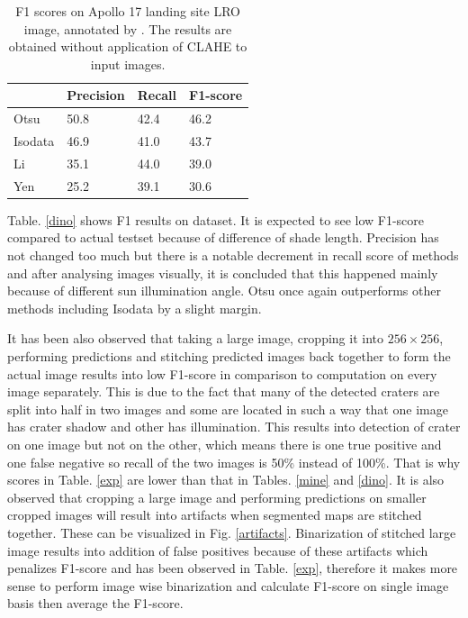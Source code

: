 \documentclass[11pt]{article}
\begin{document}
\begin{table}[H]
	\centering
	\caption{F1 scores on Apollo 17 landing site LRO image, annotated by \cite{dino2020}. The results are obtained without application of CLAHE to input images.}
	\begin{tabular}{l|l|l|l|}
		\cline{2-4}
		\multicolumn{1}{c|}{}         & Precision & Recall & F1-score \\ \hline
		\multicolumn{1}{|l|}{Otsu}    & 50.8      & 42.4   & 46.2     \\ \hline
		\multicolumn{1}{|l|}{Isodata} & 46.9      & 41.0   & 43.7     \\ \hline
		\multicolumn{1}{|l|}{Li}      & 35.1      & 44.0   & 39.0     \\ \hline
		\multicolumn{1}{|l|}{Yen}     & 25.2      & 39.1   & 30.6     \\ \hline
	\end{tabular}
\end{table}

Table. \ref{dino} shows F1 results on \cite{dino2020} dataset. It is expected to see low F1-score compared to actual testset because of difference of shade length. Precision has not changed too much but there is a notable decrement in recall score of methods and after analysing images visually, it is concluded that this happened mainly because of different sun illumination angle. Otsu once again outperforms other methods including Isodata by a slight margin.

It has been also observed that taking a large image, cropping it into $256 \times 256$, performing predictions and stitching predicted images back together to form the actual image results into low F1-score in comparison to computation on every image separately. This is due to the fact that many of the detected craters are split into half in two images and some are located in such a way that one image has crater shadow and other has illumination. This results into detection of crater on one image but not on the other, which means there is one true positive and one false negative so recall of the two images is 50\% instead of 100\%. That is why scores in Table. \ref{exp} are lower than that in Tables. \ref{mine} and \ref{dino}. It is also observed that cropping a large image and performing predictions on smaller cropped images will result into artifacts when segmented maps are stitched together. These can be visualized in Fig. \ref{artifacts}. Binarization of stitched large image results into addition of false positives because of these artifacts which penalizes F1-score and has been observed in Table. \ref{exp}, therefore it makes more sense to perform image wise binarization and calculate F1-score on single image basis then average the F1-score.
\end{document}
